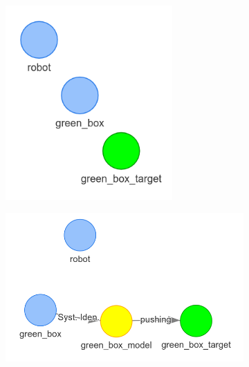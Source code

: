 \begin{figure}[H]
    \centering
    \begin{subfigure}{.3\textwidth}
    \centering
    \includegraphics[width=0.7\textwidth]{figures/connecting_nodes/robot_push_1}
    \caption{}
    \end{subfigure}
    \begin{subfigure}{.3\textwidth}
    \centering
    \includegraphics[width=1.1\textwidth]{figures/connecting_nodes/robot_push_2}
    \caption{}\label{subfig:robot_push_2}
    \end{subfigure}
    \begin{subfigure}{.3\textwidth}
    \centering

\end{subfigure}
\end{figure}
